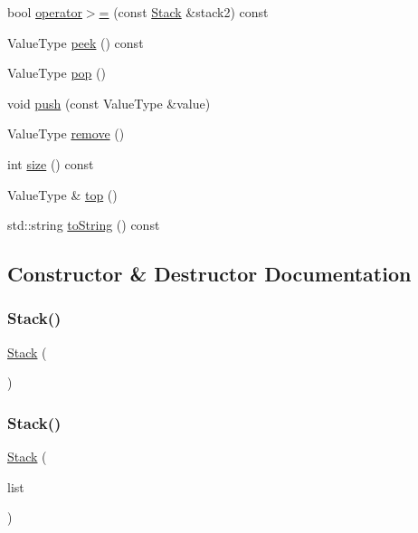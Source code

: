 \begin{DoxyCompactItemize}
\item 
bool \mbox{\hyperlink{classStack_ad2ffb92607a0ad29b040677a695ccea8}{operator$>$=}} (const \mbox{\hyperlink{classStack}{Stack}} \&stack2) const
\item 
Value\+Type \mbox{\hyperlink{classStack_a7fcf31135d35acfa8ab1174c44bf28f3}{peek}} () const
\item 
Value\+Type \mbox{\hyperlink{classStack_a278630d7ff14886cdbc3585527e91733}{pop}} ()
\item 
void \mbox{\hyperlink{classStack_a3fa54a00594a4b33b29b45c98c9f6ed4}{push}} (const Value\+Type \&value)
\item 
Value\+Type \mbox{\hyperlink{classStack_a025ec97fa5b04552f5ad0902c1f02ac1}{remove}} ()
\item 
int \mbox{\hyperlink{classStack_af9593d4a5ff4274efaf429cb4f9e57cc}{size}} () const
\item 
Value\+Type \& \mbox{\hyperlink{classStack_af4e7b293e5989a3737c116dbf8f4eaf2}{top}} ()
\item 
std\+::string \mbox{\hyperlink{classStack_a1fe5121d6528fdea3f243321b3fa3a49}{to\+String}} () const
\end{DoxyCompactItemize}


\subsection{Constructor \& Destructor Documentation}
\mbox{\label{classStack_a3fc38470bd349e85c6995ba03e6284c8}} 
\subsubsection{\texorpdfstring{Stack()}{Stack()}\hspace{0.1cm}{\footnotesize\ttfamily [1/2]}}
{\footnotesize\ttfamily \mbox{\hyperlink{classStack}{Stack}} (\begin{DoxyParamCaption}{ }\end{DoxyParamCaption})\hspace{0.3cm}{\ttfamily [default]}}

\mbox{\label{classStack_aecafaaaa5e02b2c138a10f6482963634}} 
\subsubsection{\texorpdfstring{Stack()}{Stack()}\hspace{0.1cm}{\footnotesize\ttfamily [2/2]}}
{\footnotesize\ttfamily \mbox{\hyperlink{classStack}{Stack}} (\begin{DoxyParamCaption}\item[{std\+::initializer\+\_\+list$<$ Value\+Type $>$}]{list }\end{DoxyParamCaption})}

